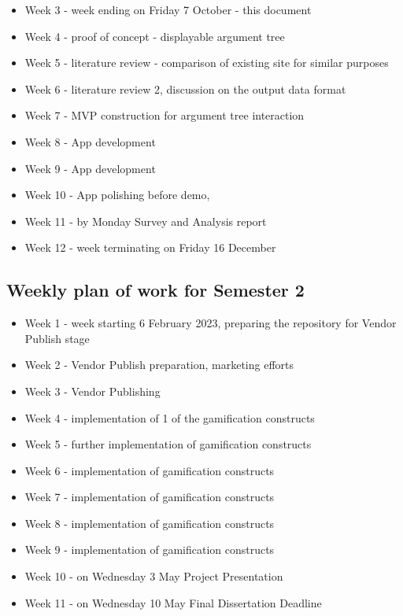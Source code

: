\documentclass{article}
\begin{document}
\begin{itemize}
  \item Week 3 - week ending on Friday 7 October - this document
  \item Week 4 - proof of concept - displayable argument tree
  \item Week 5 - literature review - comparison of existing site for similar purposes
  \item Week 6 - literature review 2, discussion on the output data format
  \item Week 7 - MVP construction for argument tree interaction
  \item Week 8 - App development
  \item Week 9 - App development
  \item Week 10 - App polishing before demo, 
  \item Week 11 - by Monday Survey and Analysis report
  \item Week 12 - week terminating on Friday 16 December
\end{itemize}

\subsection{Weekly plan of work for Semester 2}

\begin{itemize}
  \item Week 1 - week starting 6 February 2023, preparing the repository for Vendor Publish stage
  \item Week 2 - Vendor Publish preparation, marketing efforts
  \item Week 3 - Vendor Publishing
  \item Week 4 - implementation of 1 of the gamification constructs
  \item Week 5 - further implementation of gamification constructs
  \item Week 6 - implementation of gamification constructs
  \item Week 7 - implementation of gamification constructs
  \item Week 8 - implementation of gamification constructs
  \item Week 9 - implementation of gamification constructs
  \item Week 10 - on Wednesday 3 May Project Presentation
  \item Week 11 - on Wednesday 10 May Final Dissertation Deadline
\end{itemize}

\newpage
\printbibliography
\end{document}
